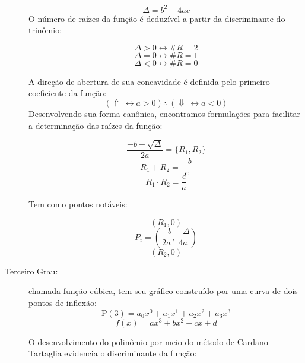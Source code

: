 \begin{description}
                \[ \Delta = b^2 - 4ac \]
                O número de raízes da função é deduzível a partir da discriminante do trinômio:
                \begin{multicols}{3}
                    \noindent\[ \Delta > 0 \leftrightarrow \#R = 2 \]
                    \[ \Delta = 0 \leftrightarrow \#R = 1 \]
                    \[ \Delta < 0 \leftrightarrow \#R = 0 \]
                \end{multicols}
                A direção de abertura de sua concavidade é definida pelo primeiro coeficiente da função:
                \[ (\Uparrow \ \leftrightarrow a > 0) \therefore \ (\Downarrow \ \leftrightarrow a < 0)  \]
                Desenvolvendo sua forma canônica, encontramos formulações para facilitar a determinação das raízes da função:
                \begin{multicols}{3}
                    \noindent\[ \frac{-b \pm \sqrt{\Delta}}{2a} = \{ R_1, R_2 \} \]
                    \[ R_1 + R_2 = \frac{-b}{c} \]
                    \[ R_1 \cdot R_2 = \frac{c}{a} \]
                \end{multicols}
                Tem como pontos notáveis:
                \begin{multicols}{3}
                    \noindent\[ \left( R_1, 0 \right) \]
                    \[ P_i = \left( \frac{-b}{2a}, \frac{-\Delta}{4a} \right) \]
                    \[ \left( R_2, 0 \right) \]
                \end{multicols}
            \item[Terceiro Grau:] chamada função cúbica, tem seu gráfico construído por uma curva de dois pontos de inflexão:
                \[ \mathrm{P}(3) = a_{0}x^{0} + a_{1}x^{1} + a_{2}x^{2} + a_{3}x^{3} \]
                \[ f(x) = ax^3 + bx^2 + cx + d \]
                \begin{center}
                \end{center}
                O desenvolvimento do polinômio por meio do método de Cardano-Tartaglia evidencia o discriminante da função:

\end{description}
